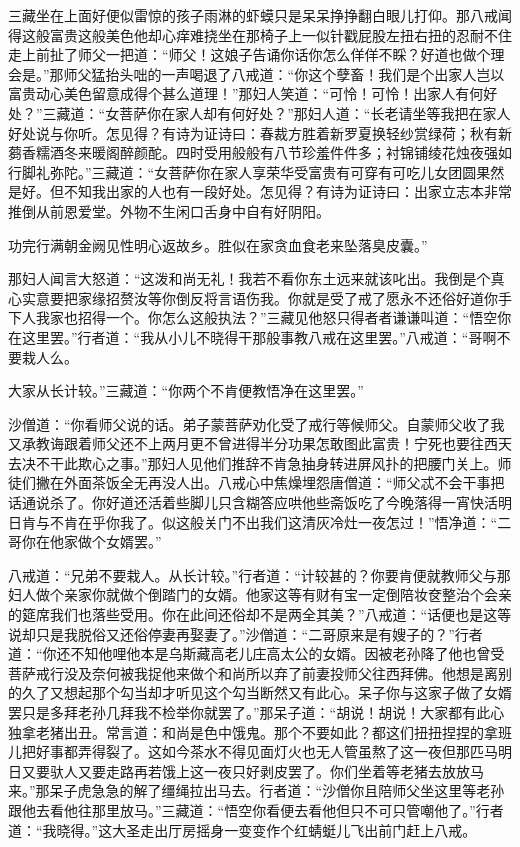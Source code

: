 \documentclass[12pt,UTF8]{ctexbook}
\begin{document}
{三藏坐在上面好便似雷惊的孩子雨淋的虾蟆只是呆呆挣挣翻白眼儿打仰。那八戒闻得这般富贵这般美色他却心痒难挠坐在那椅子上一似针戳屁股左扭右扭的忍耐不住走上前扯了师父一把道：“师父！这娘子告诵你话你怎么佯佯不睬？好道也做个理会是。”那师父猛抬头咄的一声喝退了八戒道：“你这个孽畜！我们是个出家人岂以富贵动心美色留意成得个甚么道理！”那妇人笑道：“可怜！可怜！出家人有何好处？”三藏道：“女菩萨你在家人却有何好处？”那妇人道：“长老请坐等我把在家人好处说与你听。怎见得？有诗为证诗曰：春裁方胜着新罗夏换轻纱赏绿荷；秋有新蒭香糯酒冬来暖阁醉颜酡。四时受用般般有八节珍羞件件多；衬锦铺绫花烛夜强如行脚礼弥陀。”三藏道：“女菩萨你在家人享荣华受富贵有可穿有可吃儿女团圆果然是好。但不知我出家的人也有一段好处。怎见得？有诗为证诗曰：出家立志本非常推倒从前恩爱堂。外物不生闲口舌身中自有好阴阳。

功完行满朝金阙见性明心返故乡。胜似在家贪血食老来坠落臭皮囊。”

那妇人闻言大怒道：“这泼和尚无礼！我若不看你东土远来就该叱出。我倒是个真心实意要把家缘招赘汝等你倒反将言语伤我。你就是受了戒了愿永不还俗好道你手下人我家也招得一个。你怎么这般执法？”三藏见他怒只得者者谦谦叫道：“悟空你在这里罢。”行者道：“我从小儿不晓得干那般事教八戒在这里罢。”八戒道：“哥啊不要栽人么。

大家从长计较。”三藏道：“你两个不肯便教悟净在这里罢。”

沙僧道：“你看师父说的话。弟子蒙菩萨劝化受了戒行等候师父。自蒙师父收了我又承教诲跟着师父还不上两月更不曾进得半分功果怎敢图此富贵！宁死也要往西天去决不干此欺心之事。”那妇人见他们推辞不肯急抽身转进屏风扑的把腰门关上。师徒们撇在外面茶饭全无再没人出。八戒心中焦燥埋怨唐僧道：“师父忒不会干事把话通说杀了。你好道还活着些脚儿只含糊答应哄他些斋饭吃了今晚落得一宵快活明日肯与不肯在乎你我了。似这般关门不出我们这清灰冷灶一夜怎过！”悟净道：“二哥你在他家做个女婿罢。”

八戒道：“兄弟不要栽人。从长计较。”行者道：“计较甚的？你要肯便就教师父与那妇人做个亲家你就做个倒踏门的女婿。他家这等有财有宝一定倒陪妆奁整治个会亲的筵席我们也落些受用。你在此间还俗却不是两全其美？”八戒道：“话便也是这等说却只是我脱俗又还俗停妻再娶妻了。”沙僧道：“二哥原来是有嫂子的？”行者道：“你还不知他哩他本是乌斯藏高老儿庄高太公的女婿。因被老孙降了他也曾受菩萨戒行没及奈何被我捉他来做个和尚所以弃了前妻投师父往西拜佛。他想是离别的久了又想起那个勾当却才听见这个勾当断然又有此心。呆子你与这家子做了女婿罢只是多拜老孙几拜我不检举你就罢了。”那呆子道：“胡说！胡说！大家都有此心独拿老猪出丑。常言道：和尚是色中饿鬼。那个不要如此？都这们扭扭捏捏的拿班儿把好事都弄得裂了。这如今茶水不得见面灯火也无人管虽熬了这一夜但那匹马明日又要驮人又要走路再若饿上这一夜只好剥皮罢了。你们坐着等老猪去放放马来。”那呆子虎急急的解了缰绳拉出马去。行者道：“沙僧你且陪师父坐这里等老孙跟他去看他往那里放马。”三藏道：“悟空你看便去看他但只不可只管嘲他了。”行者道：“我晓得。”这大圣走出厅房摇身一变变作个红蜻蜓儿飞出前门赶上八戒。

}
\end{document}
